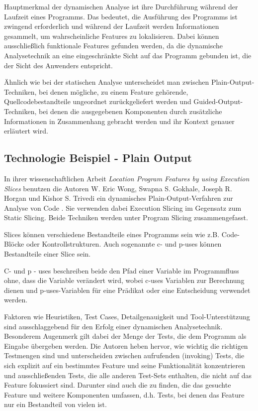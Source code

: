 \documentclass[runningheads,a4paper]{llncs}
\begin{document}
Hauptmerkmal der dynamischen Analyse ist ihre Durchführung während der Laufzeit eines Programms. Das bedeutet, die Ausführung des Programms ist zwingend erforderlich und während der Laufzeit werden Informationen gesammelt, um wahrscheinliche Features zu lokalisieren. Dabei können ausschließlich funktionale Features gefunden werden, da die dynamische Analysetechnik an eine eingeschränkte Sicht auf das Programm gebunden ist, die der Sicht des Anwenders entspricht. 

Ähnlich wie bei der statischen Analyse unterscheidet man zwischen Plain-Output-Techniken, bei denen mögliche, zu einem Feature gehörende, Quellcodebestandteile ungeordnet zurückgeliefert werden und Guided-Output-Techniken, bei denen die ausgegebenen Komponenten durch zusätzliche Informationen in Zusammenhang gebracht werden und ihr Kontext genauer erläutert wird. 

\subsection*{Technologie Beispiel - Plain Output}

In ihrer wissenschaftlichen Arbeit \textit{Location Program Features by using Execution Slices} benutzen die Autoren W. Eric Wong, Swapna S. Gokhale, Joseph R. Horgan und Kishor S. Trivedi ein dynamisches Plain-Output-Verfahren zur Analyse von Code \cite{Executionslices}. Sie verwenden dabei Execution Slicing im Gegensatz zum Static Slicing. Beide Techniken werden unter Program Slicing zusammengefasst.

Slices können verschiedene Bestandteile eines Programms sein wie z.B. Code-Blöcke oder Kontrollstrukturen. Auch sogenannte c- und p-uses können Bestandteile einer Slice sein.

C- und p - uses beschreiben beide den Pfad einer Variable im Programmfluss ohne, dass die Variable verändert wird, wobei c-uses Variablen zur Berechnung dienen und p-uses-Variablen für eine Prädikat oder eine Entscheidung verwendet werden.

Faktoren wie Heuristiken, Test Cases, Detailgenauigkeit und Tool-Unterstützung sind ausschlaggebend für den Erfolg einer dynamischen Analysetechnik. Besonderem Augenmerk gilt dabei der Menge der Tests, die dem Programm als Eingabe übergeben werden. Die Autoren heben hervor, wie wichtig die richtigen Testmengen sind und unterscheiden zwischen aufrufenden (invoking) Tests, die sich explizit auf ein bestimmtes Feature und seine Funktionalität konzentrieren und ausschließenden Tests, die alle anderen Test-Sets enthalten, die nicht auf das Feature fokussiert sind. Darunter sind auch die zu finden, die das gesuchte Feature und weitere Komponenten umfassen, d.h. Tests, bei denen das Feature nur ein Bestandteil von vielen ist.
\end{document}
